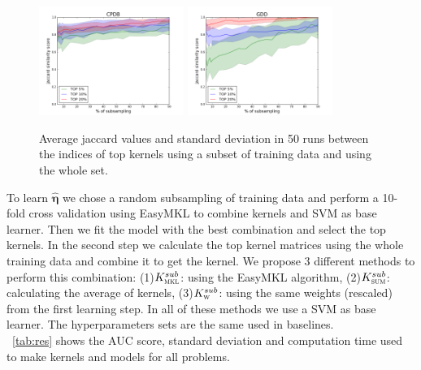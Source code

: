 \documentclass{esannV2}
\newcommand{\1}{{\bf 1}}
\newcommand{\ksmkl}{$K_{\textsc{mkl}}^{sub}$}
\newcommand{\kssum}{$K_{\textsc{sum}}^{sub}$}
\newcommand{\ksw}{$K_{\textsc{w}}^{sub}$}
\begin{document}
\begin{figure}[!htb]
\centering
\includegraphics[width=0.42\textwidth]{img/CPDB_jaccard.png}
\includegraphics[width=0.42\textwidth]{img/GDD_jaccard.png}
\caption{Average jaccard values and standard deviation in 50 runs between the indices of top kernels using a subset of training data and using the whole set.}
\label{fig:jaccard}
\end{figure}

To learn $\hat{\boldsymbol{\eta}}$ we chose a random subsampling of training data and perform a 10-fold cross validation using EasyMKL to combine kernels and SVM as base learner. Then we fit the model with the best combination and select the top kernels.
In the second step we calculate the top kernel matrices using the whole training data and combine it to get the kernel. We propose 3 different methods to perform this combination:
(1)\ksmkl: using the EasyMKL algorithm, (2)\kssum: calculating the average of kernels, (3)\ksw: using the same weights (rescaled) from the first learning step.
In all of these methods we use a SVM as base learner. The hyperparameters sets are the same used in baselines.\\
\tablename\ \ref{tab:res} shows the AUC score, standard deviation and computation time used to make kernels and models for all problems.
\end{document}
